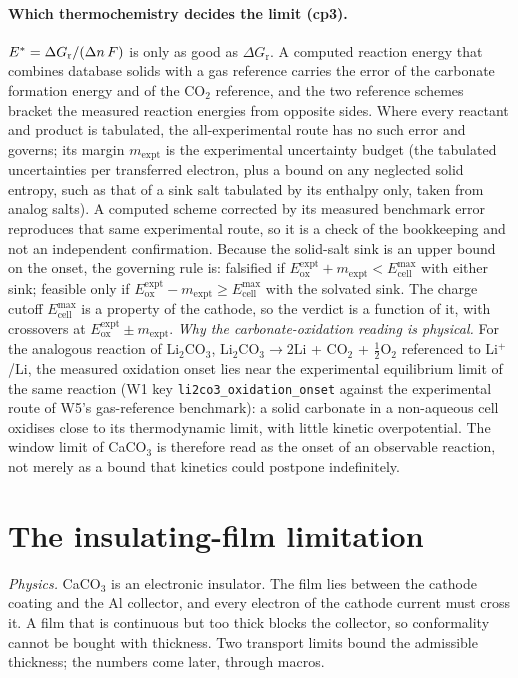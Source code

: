 \paragraph{Which thermochemistry decides the limit (cp3).} $E^{*}=\Delta G_\mathrm{r}/(\Delta n\,F)$
is only as good as $\Delta G_\mathrm{r}$. A computed reaction energy that combines database solids with
a gas reference carries the error of the carbonate formation energy and of the CO$_2$ reference, and
the two reference schemes bracket the measured reaction energies from opposite sides. Where every
reactant and product is tabulated, the all-experimental route has no such error and governs; its
margin $m_\mathrm{expt}$ is the experimental uncertainty budget (the tabulated uncertainties per
transferred electron, plus a bound on any neglected solid entropy, such as that of a sink salt
tabulated by its enthalpy only, taken from analog salts). A computed scheme corrected by its
measured benchmark error reproduces that same experimental route, so it is a check of the
bookkeeping and not an independent confirmation. Because the solid-salt sink is an upper bound on
the onset, the governing rule is: falsified if $E_\mathrm{ox}^\mathrm{expt}+m_\mathrm{expt}<E_\mathrm{cell}^{\max}$
with either sink; feasible only if $E_\mathrm{ox}^\mathrm{expt}-m_\mathrm{expt}\ge E_\mathrm{cell}^{\max}$
with the solvated sink. The charge cutoff $E_\mathrm{cell}^{\max}$ is a property of the cathode, so
the verdict is a function of it, with crossovers at $E_\mathrm{ox}^\mathrm{expt}\pm m_\mathrm{expt}$.
\emph{Why the carbonate-oxidation reading is physical.} For the analogous reaction of Li$_2$CO$_3$,
Li$_2$CO$_3\to2$Li + CO$_2$ + $\tfrac12$O$_2$ referenced to Li$^+$/Li, the measured oxidation onset
lies near the experimental equilibrium limit of the same reaction (W1 key
\texttt{li2co3\_oxidation\_onset} against the experimental route of W5's gas-reference benchmark):
a solid carbonate in a non-aqueous cell oxidises close to its thermodynamic limit, with little
kinetic overpotential. The window limit of CaCO$_3$ is therefore read as the onset of an observable
reaction, not merely as a bound that kinetics could postpone indefinitely.

\section{The insulating-film limitation}\label{th:sec:film}

\textit{Physics.} CaCO$_3$ is an electronic insulator. The film lies between the cathode coating and
the Al collector, and every electron of the cathode current must cross it. A film that is
continuous but too thick blocks the collector, so conformality cannot be bought with thickness.
Two transport limits bound the admissible thickness; the numbers come later, through macros.

